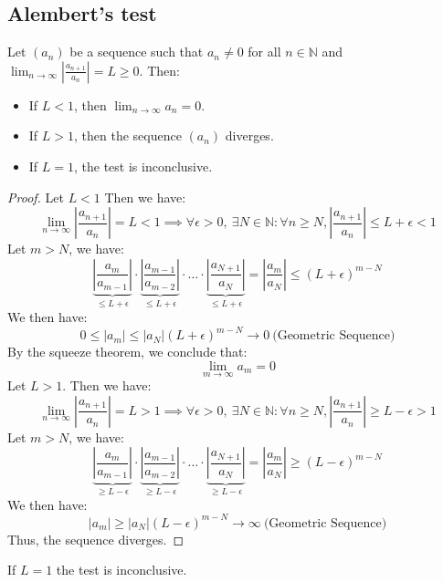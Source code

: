 \subsection{Alembert's test}
\begin{theorem}
    Let \( (a_n) \) be a sequence such that \( a_n \neq 0 \) for all \( n \in \mathbb{N} \) and \( \lim_{n \to \infty} \left| \frac{a_{n+1}}{a_n} \right| = L \geq 0 \). Then:
    \begin{itemize}[itemsep=1pt,label=$\circ$]
        \item If \( L < 1 \), then \( \lim_{n \to \infty} a_n = 0 \).
        \item If \( L > 1 \), then the sequence \( (a_n) \) diverges.
        \item If \( L = 1 \), the test is inconclusive.
    \end{itemize}
\end{theorem}
\begin{proof}
    Let $L < 1$ Then we have:
    \[
        \lim_{n \to \infty} \left| \frac{a_{n+1}}{a_n} \right| = L < 1 \implies \forall \epsilon > 0, \ \exists N \in \mathbb{N} : \forall n \geq N, \left| \frac{a_{n+1}}{a_n} \right| \leq L + \epsilon < 1
    \]
    Let $m > N$, we have:
    \[
        \underbrace{\left| \frac{a_m}{a_{m -1}} \right|}_{\leq L + \epsilon} \cdot \underbrace{\left| \frac{a_{m - 1}}{a_{m - 2}} \right|}_{\leq L + \epsilon} \cdot \ldots \cdot \underbrace{\left| \frac{a_{N + 1}}{a_N} \right|}_{\leq L + \epsilon} = \left| \frac{a_m}{a_N} \right| \leq (L + \epsilon)^{m - N}
    \]
    We then have:
    \[ 0  \leq |a_m| \leq |a_N| (L + \epsilon)^{m - N} \to 0 \ \text{(Geometric Sequence)}\]
    By the squeeze theorem, we conclude that:
    \[ \lim_{m \to \infty} a_m = 0 \]
    Let $L > 1$. Then we have:
    \[ \lim_{n \to \infty} \left| \frac{a_{n+1}}{a_n} \right| = L > 1 \implies \forall \epsilon > 0, \ \exists N \in \mathbb{N} : \forall n \geq N, \left| \frac{a_{n+1}}{a_n} \right| \geq L - \epsilon > 1 \]
    Let $m > N$, we have:
    \[ \underbrace{\left| \frac{a_m}{a_{m -1}} \right|}_{\geq L - \epsilon} \cdot \underbrace{\left| \frac{a_{m - 1}}{a_{m - 2}} \right|}_{\geq L - \epsilon} \cdot \ldots \cdot \underbrace{\left| \frac{a_{N + 1}}{a_N} \right|}_{\geq L - \epsilon} = \left| \frac{a_m}{a_N} \right| \geq (L - \epsilon)^{m - N}
    \]
    We then have:
    \[ |a_m| \geq |a_N| (L - \epsilon)^{m - N} \to \infty \ \text{(Geometric Sequence)}\]
    Thus, the sequence diverges.
\end{proof}
If $L = 1$ the test is inconclusive.
